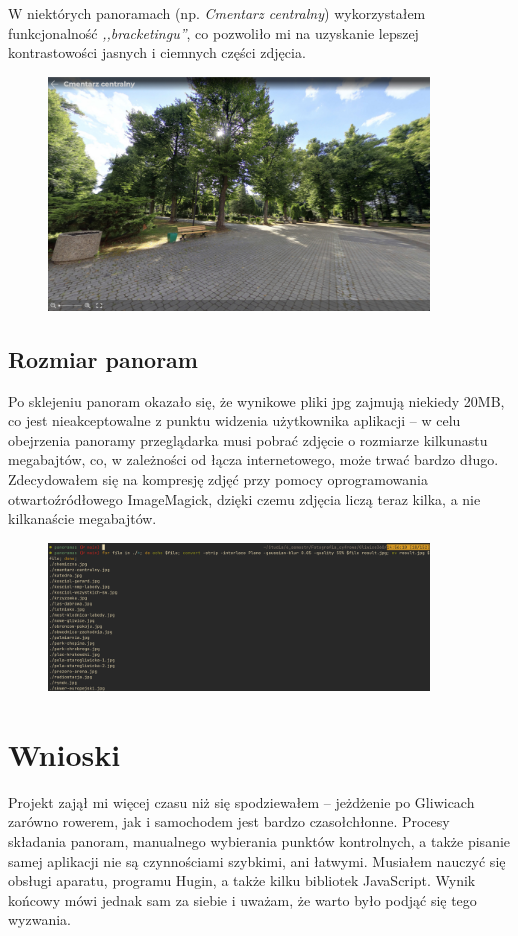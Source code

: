 \documentclass[a4paper]{mwart}
\begin{document}
W niektórych panoramach (np. \textit{Cmentarz centralny}) wykorzystałem
funkcjonalność \textit{,,bracketingu''}, co pozwoliło mi na uzyskanie lepszej
kontrastowości jasnych i ciemnych części zdjęcia. 
\begin{figure}[H]
\centering
\includegraphics[width=0.9\textwidth]{images/cemetary.jpg}
\end{figure}

\subsection{Rozmiar panoram}
Po sklejeniu panoram okazało się, że wynikowe pliki jpg zajmują niekiedy 20MB,
co jest nieakceptowalne z punktu widzenia użytkownika aplikacji -- w celu
obejrzenia panoramy przeglądarka musi pobrać zdjęcie o rozmiarze kilkunastu
megabajtów, co, w zależności od łącza internetowego, może trwać bardzo długo.
Zdecydowałem się na kompresję zdjęć przy pomocy oprogramowania otwartoźródłowego
ImageMagick, dzięki czemu zdjęcia liczą teraz kilka, a nie kilkanaście
megabajtów.
\begin{figure}[H]
\centering
\includegraphics[width=0.9\textwidth]{images/convert.jpg}
\end{figure}

\section{Wnioski}
Projekt zajął mi więcej czasu niż się spodziewałem -- jeżdżenie po Gliwicach 
zarówno rowerem, jak i samochodem jest bardzo czasołchłonne. Procesy składania
panoram, manualnego wybierania punktów kontrolnych, a także pisanie samej
aplikacji nie są czynnościami szybkimi, ani łatwymi. Musiałem nauczyć się
obsługi aparatu, programu Hugin, a także kilku bibliotek JavaScript.
Wynik końcowy mówi jednak sam za siebie i uważam, że warto było podjąć się tego
wyzwania.
\end{document}

